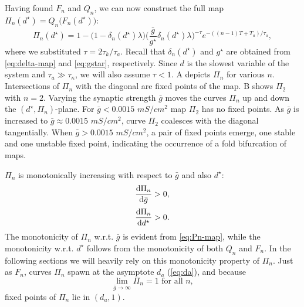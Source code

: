 \documentclass[utf8]{frontiersFPHY} %
\begin{document}
Having found $F_n$ and $Q_n$, we can now construct the full map $\Pi_n(d^\star)=Q_n\big(F_n(d^\star)\big)$:
\begin{equation}
	\label{eq:Pn-map}
	\Pi_n(d^\star) = 1 - \Big(1 - \delta_n(d^\star) \lambda \Big)
	\Big(\frac{\bar g}{g^\star}\delta_n(d^\star) \lambda \Big)^{-\tau}
	e^{-((n-1)T + T_{a})/\tau_a},
\end{equation}
where we substituted $\tau = 2\tau_{k}/\tau_{a}$.
Recall that $\delta_{n}(d^{\star})$ and $g^{\star}$ are obtained from \cref{eq:delta-map} and \cref{eq:gstar}, respectively.
Since $d$ is the slowest variable of the system and $\tau_a \gg \tau_\kappa$, we will also assume $\tau<1$.
A depicts $\Pi_n$ for various $n$.
Intersections of $\Pi_{n}$ with the diagonal are fixed points of the map.
B shows $\Pi_{2}$ with $n=2$.
Varying the synaptic strength $\bar g$ moves the curves $\Pi_{n}$ up and down the $(d^{\star}, \Pi_{n})$-plane.
For $\bar g < 0.0015$ $\si{mS/cm^{2}}$ map $\Pi_{2}$ has no fixed points.
As $\bar g$ is increased to $\bar g \approx 0.0015$ $\si{mS/cm^{2}}$, curve $\Pi_{2}$ coalesces with the diagonal tangentially.
When $\bar g > 0.0015$ $\si{mS/cm^{2}}$, a pair of fixed points emerge, one stable and one unstable fixed point, indicating the occurrence of a fold bifurcation of maps.


$\Pi_n$ is monotonically increasing with respect to $\bar g$ and also $d^\star$:
\begin{align}
	\label{eq:non-degen1}
	\dv{\Pi_n}{\bar g}  & >0, \\[0.5ex]
	\label{eq:dPidd}
	\dv{\Pi_n}{d^\star} & >0.
\end{align}
\noindent
The monotonicity of $\Pi_{n}$ w.r.t. $\bar g$ is evident from \cref{eq:Pn-map}, while the monotonicity w.r.t. $d^{\star}$ follows from the monotonicity of both $Q_{n}$ and $F_{n}$.
In the following sections we will heavily rely on this monotonicity property of $\Pi_n$.
Just as $F_n$, curves $\Pi_n$ spawn at the asymptote $d_{a}$ (\cref{eq:da}), and because
\begin{equation}
	\lim_{\bar g \to \infty}\Pi_n = 1\text{ for all }n,
\end{equation}
fixed points of $\Pi_n$ lie in $(d_{a}, 1)$.
\end{document}
